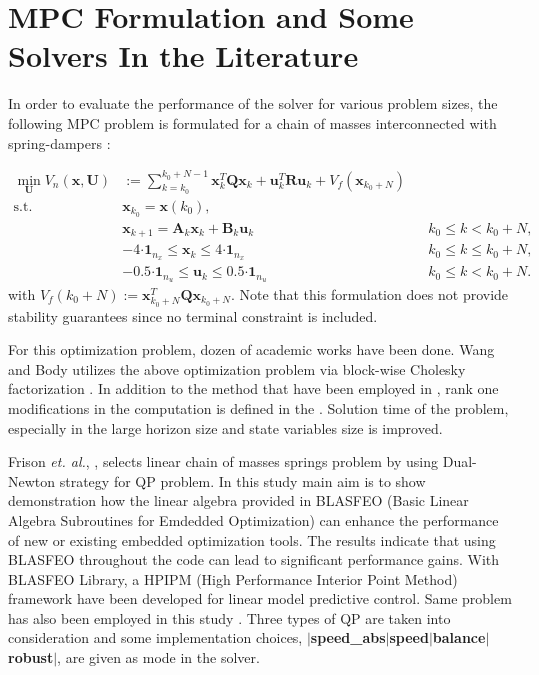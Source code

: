\documentclass[12pt]{article}
\begin{document}
 

\section{MPC Formulation and Some Solvers In the Literature} \label{MPC_Formulation}
In order to evaluate the performance of the solver for various problem sizes, the following MPC problem is formulated for a chain of masses interconnected with spring-dampers \cite{Domahidi2012}:

\begin{equation}
	\begin{aligned}
		\min_{\bm{U}} V_{n}(\bm{x},\bm{U})  & := \sum_{k=k_{0}}^{k_{0}+N-1} \bm{x}_{k}^{T}\bm{Q}\bm{x}_{k} + \bm{u}_{k}^{T}\bm{R}\bm{u}_{k} + V_{f}(\bm{x}_{k_{0}+N})\\
		\textrm{s.t.} \quad & \bm{x}_{k_{0}} = \bm{x}(k_{0}),\\
	    & \bm{x}_{k+1} = \bm{A}_{k}\bm{x}_{k} + \bm{B}_{k}\bm{u}_{k}  &&k_{0} \leq k < k_{0} + N, \\
	    & -4\bm{\cdot}\bm{1}_{n_x} \leq \bm{x}_{k} \leq 4\bm{\cdot}\bm{1}_{n_x}  &&k_{0} \leq k \leq k_{0} + N,\\
	    & -0.5\bm{\cdot}\bm{1}_{n_u} \leq \bm{u}_{k} \leq 0.5\bm{\cdot}\bm{1}_{n_u}  &&k_{0} \leq k < k_{0} + N.
	\end{aligned}
\end{equation}
with $V_{f}(k_{0}+N) := \bm{x}_{k_{0}+N}^{T}\bm{Q}\bm{x}_{k_{0}+N}$.  Note
that this formulation does not provide stability guarantees since no terminal constraint is included. \newline 

\par \noindent For this optimization problem, dozen of academic works have been done. Wang and Body utilizes the above optimization problem via block-wise Cholesky factorization \cite{Wang2010}. In addition to the method that have been employed in \cite{Wang2010}, rank one modifications in the computation is defined in the \cite{Domahidi2012}. Solution time of the problem, especially in the large horizon size and state variables size is improved. \newline

\par \noindent Frison \textit{et. al.}, \cite{Frison2018}, selects linear chain of masses springs problem by using Dual-Newton strategy for QP problem. In this study main aim is to show demonstration how the linear algebra provided in BLASFEO (Basic Linear Algebra Subroutines for Emdedded Optimization) can enhance the performance of new or existing embedded optimization tools. The results indicate that using BLASFEO
throughout the code can lead to significant performance gains. With BLASFEO Library, a HPIPM (High Performance Interior Point Method) framework have been developed for linear model predictive control. Same problem has also been employed in this study \cite{Frison2020}. Three types of QP are taken into consideration and some implementation choices, $\mid$\textbf{speed\_abs}$\mid$\textbf{speed}$\mid$\textbf{balance}$\mid$ \textbf{robust}$\mid$, are given as mode in the solver.   
 
\end{document}
